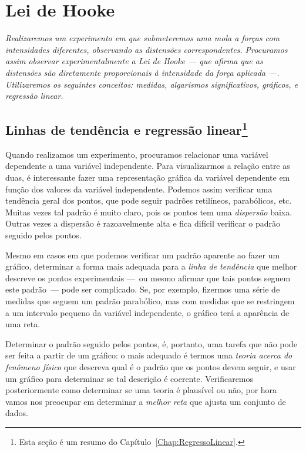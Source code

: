 \chapter{Lei de Hooke}
\label{Chap:ExpLeiDeHooke}

\begin{fullwidth}\it
	Realizaremos um experimento em que submeteremos uma mola a forças com intensidades diferentes, observando as distensões correspondentes. Procuramos assim observar experimentalmente a Lei de Hooke --- que afirma que as distensões são diretamente proporcionais à intensidade da força aplicada ---. Utilizaremos os seguintes conceitos: medidas, algarismos significativos, gráficos, e regressão linear.
\end{fullwidth}

\section[Linhas de tendência e regressão linear]{Linhas de tendência e regressão linear\footnote{Esta seção é um resumo do Capítulo~\ref{Chap:RegressoLinear}.}}

Quando realizamos um experimento, procuramos relacionar uma variável dependente a uma variável independente. Para visualizarmos a relação entre as duas, é interessante fazer uma representação gráfica da variável dependente em função dos valores da variável independente. Podemos assim verificar uma tendência geral dos pontos, que pode seguir padrões retilíneos, parabólicos, etc. Muitas vezes tal padrão é muito claro, pois os pontos tem uma \emph{dispersão} baixa. Outras vezes a dispersão é razoavelmente alta e fica difícil verificar o padrão seguido pelos pontos.

Mesmo em casos em que podemos verificar um padrão aparente ao fazer um gráfico, determinar a forma mais adequada para a \emph{linha de tendência} que melhor descreve os pontos experimentais ---~ou mesmo afirmar que tais pontos seguem este padrão~--- pode ser complicado. Se, por exemplo, fizermos uma série de medidas que seguem um padrão parabólico, mas com medidas que se restringem a um intervalo pequeno da variável independente, o gráfico terá a aparência de uma reta.

Determinar o padrão seguido pelos pontos, é, portanto, uma tarefa que não pode ser feita a partir de um gráfico: o mais adequado é termos uma \emph{teoria acerca do fenômeno físico} que descreva qual é o padrão que os pontos devem seguir, e usar um gráfico para determinar se tal descrição é coerente. Verificaremos posteriormente como determinar se uma teoria é plausível ou não, por hora vamos nos preocupar em determinar a \emph{melhor reta} que ajusta um conjunto de dados.

